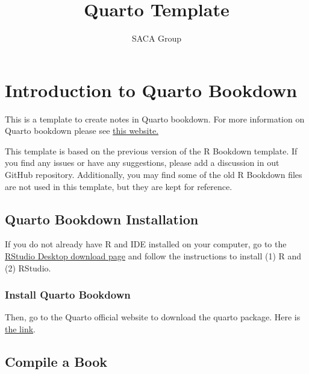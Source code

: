 \documentclass[
  letterpaper,
  oneside]{book}
\title{Quarto Template}
\author{SACA Group}
\date{}
\numberwithin{equation}{section}
\numberwithin{figure}{section}
\theoremstyle{break}
\renewcommand*\contentsname{Table of contents}
\newcommand\contentsname{Table of contents}
\theoremstyle{plain}
\theoremstyle{remark}
\begin{document}
\frontmatter
\maketitle

\renewcommand*\contentsname{Table of contents}
{
\setcounter{tocdepth}{2}
\tableofcontents
}
\listoffigures
\listoftables

\mainmatter
{}

\chapter{Introduction to Quarto
Bookdown}\label{introduction-to-quarto-bookdown}

This is a template to create notes in Quarto bookdown. For more
information on Quarto bookdown please see
\href{https://quarto.org/?target=_blank}{this website.}

This template is based on the previous version of the R Bookdown
template. If you find any issues or have any suggestions, please add a
discussion in out GitHub repository. Additionally, you may find some of
the old R Bookdown files are not used in this template, but they are
kept for reference.

\section{Quarto Bookdown
Installation}\label{quarto-bookdown-installation}

If you do not already have R and IDE installed on your computer, go to
the
\href{https://posit.co/download/rstudio-desktop/?target=_blank}{RStudio
Desktop download page} and follow the instructions to install (1) R and
(2) RStudio.

\subsection*{Install Quarto Bookdown}\label{install-quarto-bookdown}

Then, go to the Quarto official website to download the quarto package.
Here is \href{https://quarto.org/docs/get-started/?target=_blank}{the
link}.

\section{Compile a Book}\label{compile-a-book}
\end{document}
